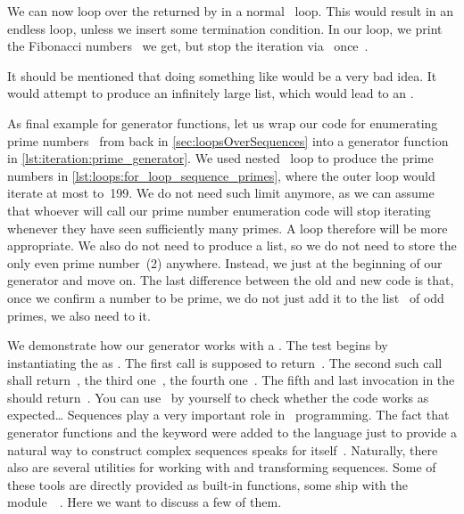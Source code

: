 We can now loop over the  returned by  in a normal ~loop.
This would result in an endless loop, unless we insert some termination condition.
In our loop, we print the Fibonacci numbers~ we get, but stop the iteration via~ once~.

It should be mentioned that doing something like  would be a very bad idea.
It would attempt to produce an infinitely large list, which would lead to an .

As final example for generator functions, let us wrap our code for enumerating prime numbers~\cite{W2024PN,CP2005PNACP,R1994PNACMFF} from back in \cref{sec:loopsOverSequences} into a generator function in \cref{lst:iteration:prime_generator}.
We used nested ~loop to produce the prime numbers in \cref{lst:loops:for_loop_sequence_primes}, where the outer loop would iterate at most to~199.
We do not need such limit anymore, as we can assume that whoever will call our prime number enumeration code will stop iterating whenever they have seen sufficiently many primes.
A  loop therefore will be more appropriate.
We also do not need to produce a list, so we do not need to store the only even prime number~(2) anywhere.
Instead, we just  at the beginning of our generator and move on.
The last difference between the old and new code is that, once we confirm a number to be prime, we do not just add it to the list~ of odd primes, we also need to  it.

We demonstrate how our generator works with a .
The test begins by instantiating the  as .
The first  call is supposed to return~.
The second such call shall return~, the third one~, the fourth one~.
The fifth and last  invocation in the  should return~.
You can use \pytest\ by yourself to check whether the code works as expected\dots%
\FloatBarrier%
\endhsection%
%
%
\label{sec:operationsOnIterators}%
%
%
%
Sequences play a very important role in \python\ programming.
The fact that generator functions and the  keyword were added to the language just to provide a natural way to construct complex sequences speaks for itself~\cite{PEP255}.
Naturally, there also are several utilities for working with and transforming sequences.
Some of these tools are directly provided as built-in functions, some ship with the module~~\cite{PSF2024IFCIFEL}.
Here we want to discuss a few of them.

